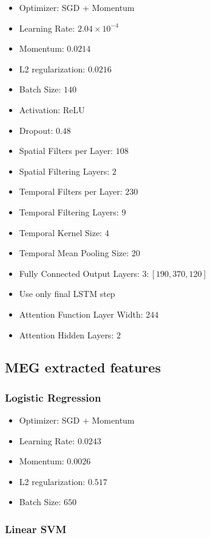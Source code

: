 \begin{itemize}
\item Optimizer: SGD + Momentum
\item Learning Rate: $2.04 \times 10^{-4}$
\item Momentum: $0.0214$
\item L2 regularization: $0.0216$
\item Batch Size: $140$
\item Activation: ReLU
\item Dropout: $0.48$
\item Spatial Filters per Layer: $108$
\item Spatial Filtering Layers: $2$
\item Temporal Filters per Layer: $230$
\item Temporal Filtering Layers: $9$
\item Temporal Kernel Size: $4$
\item Temporal Mean Pooling Size: $20$
\item Fully Connected Output Layers: $3: [190, 370, 120]$
\item Use only final LSTM step
\item Attention Function Layer Width: $244$
\item Attention Hidden Layers: $2$
\end{itemize}

\subsection{MEG extracted features}

\subsubsection{Logistic Regression}

\begin{itemize}
\item Optimizer: SGD + Momentum
\item Learning Rate: $0.0243$
\item Momentum: $0.0026$
\item L2 regularization: $0.517$
\item Batch Size: $650$
\end{itemize}

\subsubsection{Linear SVM}


